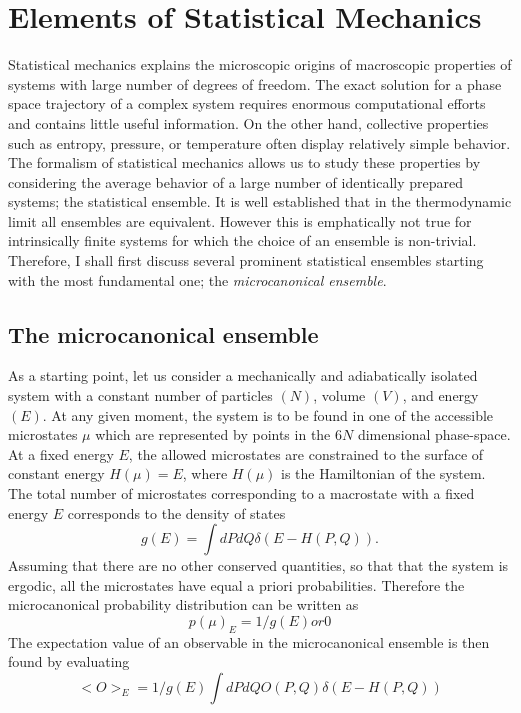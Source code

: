 \documentclass[12pt]{report}
\begin{document}
\chapter{Elements of Statistical Mechanics}
Statistical mechanics explains the microscopic origins of macroscopic properties of systems with large number of degrees of freedom. The exact solution for a phase space trajectory of a complex system requires enormous computational efforts and contains little useful information. On the other hand, collective properties such as entropy, pressure, or temperature often display relatively simple behavior. The formalism of statistical mechanics allows us to study these properties by considering the average behavior of a large number of identically prepared systems; the statistical ensemble. It is well established that in the thermodynamic limit all ensembles are equivalent. However this is emphatically not true for intrinsically finite systems for which the choice of an ensemble is non-trivial. Therefore, I shall first discuss several prominent statistical ensembles starting with the most fundamental one; the \textit{microcanonical ensemble}.

\section{The microcanonical ensemble}
As a starting point, let us consider a mechanically and adiabatically isolated system with a constant number of particles $(N)$, volume $(V)$, and energy $(E)$. At any given moment, the system is to be found in one of the accessible microstates $\mu$ which are represented by points in the $6N$ dimensional phase-space. At a fixed energy $E$, the allowed microstates are constrained to the surface of constant energy $H(\mu) = E$, where $H(\mu)$ is the Hamiltonian of the system. The total number of microstates corresponding to a macrostate with a fixed energy $E$ corresponds to the density of states
\begin{equation}
g(E) = \int dPdQ \delta(E - H(P,Q)).
\end{equation} 
Assuming that there are no other conserved quantities, so that that the system is ergodic, all the microstates have equal a priori probabilities. Therefore the microcanonical probability distribution can be written as 
\begin{equation}
p(\mu)_{E} = 1/g(E) or 0
\end{equation}
The expectation value of an observable in the microcanonical ensemble is then found by evaluating
\begin{equation}
<O>_{E} = 1/g(E)\int dPdQ  O(P,Q)\delta(E - H(P,Q))
\end{equation}
\end{document}
